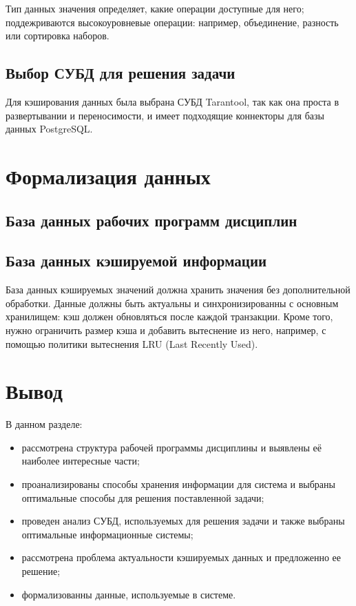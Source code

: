 Тип данных значения определяет, какие операции доступные для него; поддежриваются высокоуровневые операции: например, объединение, разность или сортировка наборов.

\subsection{Выбор СУБД для решения задачи}

Для кэширования данных была выбрана СУБД Tarantool, так как она проста в развертывании и переносимости, и имеет подходящие коннекторы для базы данных PostgreSQL.

\section{Формализация данных}

\subsection{База данных рабочих программ дисциплин}

\subsection{База данных кэшируемой информации}

База данных кэшируемых значений должна хранить значения без дополнительной обработки. Данные должны быть актуальны и синхронизированны с основным хранилищем: кэш должен обновляться после каждой транзакции. Кроме того, нужно ограничить размер кэша и добавить вытеснение из него, например, с помощью политики вытеснения LRU \cite{lru} (Last Recently Used).

\section*{Вывод}

В данном разделе:

\begin{itemize}
 \item рассмотрена структура рабочей программы дисциплины и выявлены её наиболее интересные части;
 \item проанализированы способы хранения информации для система и выбраны оптимальные способы для решения поставленной задачи; 
 \item проведен анализ СУБД, используемых для решения задачи и также выбраны оптимальные информационные системы; 
 \item рассмотрена проблема актуальности кэшируемых данных и предложенно ее решение;
 \item формализованны данные, используемые в системе.
\end{itemize}

